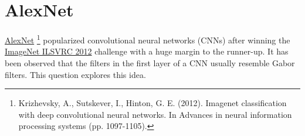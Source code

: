 \section{AlexNet}

\href{http://papers.nips.cc/paper/4824-imagenet-classification-with-deep-convolutional-neural-networks.pdf}{AlexNet}
\footnote{Krizhevsky, A., Sutskever, I., Hinton, G. E. (2012). Imagenet classification with deep convolutional neural networks. In Advances in neural information processing systems (pp. 1097-1105).}  popularized convolutional neural networks (CNNs) after winning the \href{http://image-net.org/challenges/LSVRC/2012/index}{ImageNet ILSVRC 2012} challenge with a huge margin to the runner-up.
It has been observed that the filters in the first layer of a CNN usually resemble Gabor filters.
This question explores this idea.

